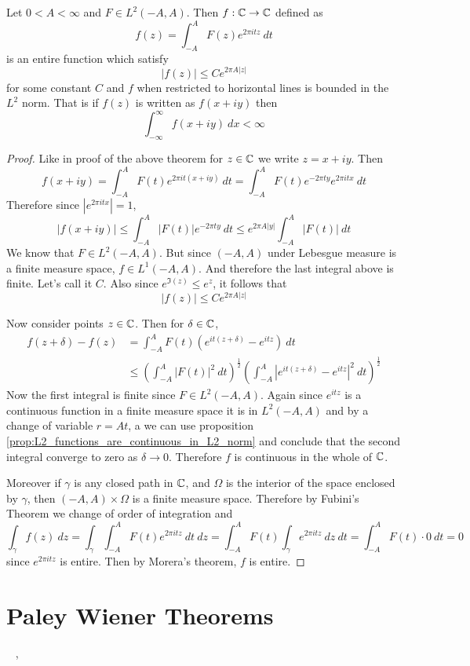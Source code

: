 \begin{proposition}
  Let $0<A<\infty$ and $F \in L^2(-A, A)$. Then $f:\mathbb C \to \mathbb C$ defined as $$f(z) = \int_{-A}^A F(z)e^{2\pi itz} \ dt$$
  is an entire function which satisfy $$|f(z)| \le Ce^{2 \pi A|z|}$$
  for some constant $C$ and $f$ when restricted to horizontal lines is bounded in the $L^2$ norm. That is if $f(z)$ is written as $f(x+iy)$ then  $$\int_{-\infty}^{\infty} f(x+iy) \ dx < \infty$$
\end{proposition}
\begin{proof}
  Like in proof of the above theorem for $z\in \mathbb C$ we write $z = x+iy$. Then $$f(x+iy) = \int_{-A}^A F(t) e^{2\pi it(x+iy)} \ dt = \int_{-A}^A F(t)e^{-2\pi ty}e^{2\pi itx} \ dt$$
  Therefore since $|e^{2\pi it x}| = 1$, $$\left|f(x+iy)\right| \le \int_{-A}^A \left|F(t)\right| e^{-2\pi ty} \ dt \le e^{2\pi A|y|} \int_{-A}^A \left|F(t)\right| \ dt $$
  We know that $F \in L^2(-A, A)$. But since $(-A, A)$ under Lebesgue measure is a finite measure space, $f \in L^1(-A, A)$. And therefore the last integral above is finite. Let's call it $C$. Also since $e^{\Im(z)} \le e^z$, it follows that $$\left|f(z) \right| \le Ce^{2\pi A |z|}$$

  Now consider points $z \in \mathbb C$. Then for $\delta \in \mathbb C$,
  \begin{align*}
    f(z+\delta) - f(z) &= \int_{-A}^A F(t)\left(e^{it(z+\delta)} - e^{itz}\right) \ dt \\
    &\le \left(\int_{-A}^A \left|F(t)\right|^2\ dt \right)^{\frac{1}{2}} \left(\int_{-A}^A \left|e^{it(z+\delta)}-e^{itz}\right|^2 \ dt \right)^{\frac{1}{2}}
  \end{align*}
  Now the first integral is finite since $F\in L^2(-A, A)$. Again since $e^{itz}$ is a continuous function in a finite measure space it is in $L^2(-A, A)$ and by a change of variable $r = At$, a we can use proposition \ref{prop:L2_functions_are_continuous_in_L2_norm} and conclude that the second integral converge to zero as $\delta \to 0$. Therefore $f$ is continuous in the whole of $\mathbb C$. 

  Moreover if $\gamma$ is any closed path in $\mathbb C$, and $\Omega$ is the interior of the space enclosed by $\gamma$, then $(-A, A)\times\Omega$ is a finite measure space. Therefore by Fubini's Theorem we change of order of integration and $$\int_\gamma f(z) \ dz = \int_\gamma \int_{-A}^A F(t)e^{2\pi itz} \ dt \ dz = \int_{-A}^A F(t) \int_\gamma e^{2\pi itz} \ dz \ dt = \int_{-A}^A F(t)\cdot 0 \ dt = 0$$
  since $e^{2\pi itz}$ is entire. Then by Morera's theorem, $f$ is entire.
\end{proof}

\section{Paley Wiener Theorems}
\
\cite{axler} \cite{rudin}, \cite{grafakos}
